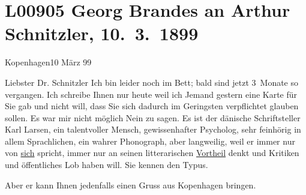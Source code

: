 

\section[Georg Brandes an Arthur Schnitzler, 10. 3. 1899]{L00905 Georg Brandes an Arthur Schnitzler, 10. 3. 1899}
\nopagebreak{}
\rehead{ }\normalsize\beginnumbering{}
\toendnotes[C]{\smallbreak\pagebreak[2]}
\toendnotes[C]{\smallbreak}
\pstart
           \raggedleft{}{\pb}Kopenhagen10 März 99\pend
           
\pstart{}Liebster Dr. Schnitzler\pend\vspace{0.5em}
\pstart
           Ich bin leider noch im Bett; bald sind jetzt 3 Monate so vergangen. Ich schreibe
               Ihnen nur heute weil ich Jemand gestern eine Karte für Sie gab und nicht will, dass Sie sich dadurch
               im Geringsten verpflichtet glauben sollen. Es war mir nicht möglich Nein zu sagen. Es
               ist der dänische Schriftsteller Karl Larsen, ein talentvoller Mensch,
               gewissenhafter Psycholog, sehr feinhörig in allem Sprachlichen, ein wahrer
               Phonograph, aber langweilig, weil er immer nur von \uline{sich} spricht, immer nur an seinen litterarischen \uline{Vortheil} denkt und Kritiken und öffentliches Lob haben will. Sie kennen den
               Typus.\pend
           
\pstart
           Aber er kann Ihnen jedenfalls einen {\pb}Gruss aus Kopenhagen bringen.\pend
           
